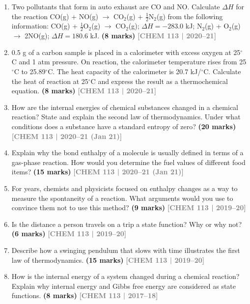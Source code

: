 \documentclass[12pt,a3paper]{article}
\newcommand{\yr}[1]{\hfill\textcolor{gray}{\small\textbf{[#1]}}}
\newcommand{\mk}[1]{\textcolor{orange!70!black}{\small\textbf{(#1 marks)}}}
\begin{document}
\begin{enumerate}
\item Two pollutants that form in auto exhaust are CO and NO. Calculate $\Delta H$ for the reaction CO(g) + NO(g) $\rightarrow$ CO$_2$(g) + $\frac{1}{2}$N$_2$(g) from the following information: CO(g) + $\frac{1}{2}$O$_2$(g) $\rightarrow$ CO$_2$(g); $\Delta H = -283.0$ kJ; N$_2$(g) + O$_2$(g) $\rightarrow$ 2NO(g); $\Delta H = 180.6$ kJ. \mk{8}
\yr{CHEM 113 | 2020--21}



\item 0.5 g of a carbon sample is placed in a calorimeter with excess oxygen at 25$^\circ$C and 1 atm pressure. On reaction, the calorimeter temperature rises from 25$^\circ$C to 25.89$^\circ$C. The heat capacity of the calorimeter is 20.7 kJ/$^\circ$C. Calculate the heat of reaction at 25$^\circ$C and express the result as a thermochemical equation. \mk{8}
\yr{CHEM 113 | 2020--21}



\item How are the internal energies of chemical substances changed in a chemical reaction? State and explain the second law of thermodynamics. Under what conditions does a substance have a standard entropy of zero? \mk{20}
\yr{CHEM 113 | 2020--21 (Jan 21)}



\item Explain why the bond enthalpy of a molecule is usually defined in terms of a gas-phase reaction. How would you determine the fuel values of different food items? \mk{15}
\yr{CHEM 113 | 2020--21 (Jan 21)}



\item For years, chemists and physicists focused on enthalpy changes as a way to measure the spontaneity of a reaction. What arguments would you use to convince them not to use this method? \mk{9}
\yr{CHEM 113 | 2019--20}



\item Is the distance a person travels on a trip a state function? Why or why not? \mk{6}
\yr{CHEM 113 | 2019--20}



\item Describe how a swinging pendulum that slows with time illustrates the first law of thermodynamics. \mk{15}
\yr{CHEM 113 | 2019--20}



\item How is the internal energy of a system changed during a chemical reaction? Explain why internal energy and Gibbs free energy are considered as state functions. \mk{8}
\yr{CHEM 113 | 2017--18}




\end{enumerate}
\end{document}

